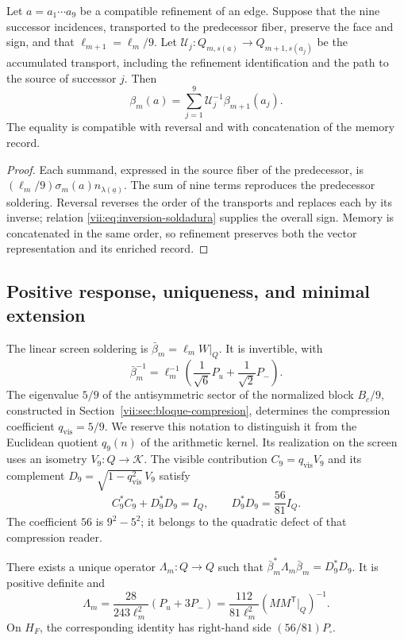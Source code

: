 \begin{proposition}
\label{vii:prop:refinamiento-soldadura}
Let \(a=a_1\cdots a_9\) be a compatible refinement of an edge.
Suppose that the nine successor incidences, transported to the predecessor fiber,
preserve the face and sign, and that
\(\ell_{m+1}=\ell_m/9\). Let
\(\mathcal U_j:Q_{m,s(a)}\longrightarrow Q_{m+1,s(a_j)}\)
be the accumulated transport, including the refinement identification
and the path to the source of successor \(j\). Then
\[
 \beta_m(a)=
 \sum_{j=1}^{9}\mathcal U_j^{-1}\beta_{m+1}(a_j).
\]
The equality is compatible with reversal and with concatenation
of the memory record.
\end{proposition}

\begin{proof}
Each summand, expressed in the source fiber of the predecessor, is
\((\ell_m/9)\sigma_m(a)n_{\lambda(\underline a)}\).
The sum of nine terms reproduces the predecessor soldering.
Reversal reverses the order of the transports and replaces each
by its inverse; relation \eqref{vii:eq:inversion-soldadura} supplies
the overall sign. Memory is concatenated in the same order, so
refinement preserves both the vector representation and its
enriched record.
\end{proof}

\subsection{Positive response, uniqueness, and minimal extension}
\label{vii:sec:respuesta-positiva}

The linear screen soldering is
\(\bar\beta_m=\ell_mW|_Q\). It is invertible, with
\[
 \bar\beta_m^{-1}
 =\ell_m^{-1}\left(\frac1{\sqrt6}P_u+\frac1{\sqrt2}P_-\right).
\]
The eigenvalue \(5/9\) of the antisymmetric sector of the normalized block
\(B_c/9\), constructed in Section~\ref{vii:sec:bloque-compresion},
determines the compression coefficient
\(q_{\mathrm{vis}}=5/9\). We reserve this notation to
distinguish it from the Euclidean quotient \(q_9(n)\) of the arithmetic kernel.
Its realization on the screen uses an isometry
\(V_9:Q\longrightarrow\mathcal K\). The visible contribution
\(C_9=q_{\mathrm{vis}}V_9\) and its complement
\(D_9=\sqrt{1-q_{\mathrm{vis}}^2}\,V_9\) satisfy
\[
 C_9^*C_9+D_9^*D_9=I_Q,\qquad D_9^*D_9=\frac{56}{81}I_Q.
\]
The coefficient \(56\) is \(9^2-5^2\); it belongs to the quadratic defect
of that compression reader.

\begin{theorem}
\label{vii:thm:respuesta-unica}
There exists a unique operator \(\Lambda_m:Q\longrightarrow Q\) such that
\(\bar\beta_m^*\Lambda_m\bar\beta_m=D_9^*D_9\). It is positive definite and
\begin{equation}
 \Lambda_m=\frac{28}{243\ell_m^2}(P_u+3P_-)
 =\frac{112}{81\ell_m^2}
       (MM^{\mathsf T}|_Q)^{-1}.
 \label{vii:eq:lambda-pantalla}
\end{equation}
On \(H_F\), the corresponding identity has right-hand side
\((56/81)P_\square\).
\end{theorem}

